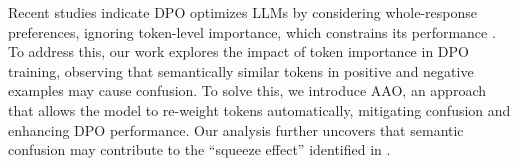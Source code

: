 
Recent studies indicate DPO optimizes LLMs by considering whole-response preferences, ignoring token-level importance, which constrains its performance \cite{zeng2024token,liu2024tis,gu2025mask}. To address this, our work explores the impact of token importance in DPO training, observing that semantically similar tokens in positive and negative examples may cause confusion. 
To solve this, we introduce AAO, an approach that allows the model to re-weight tokens automatically, mitigating confusion and enhancing DPO performance. Our analysis further uncovers that semantic confusion may contribute to the “squeeze effect” identified in \cite{ren2024learning}.
